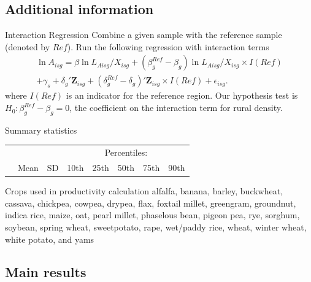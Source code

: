 \documentclass[10pt, xcolor=dvipsnames]{beamer}
\begin{document}
\subsection{Additional information}
\begin{frame}{Interaction Regression}\label{interaction}
Combine a given sample with the reference sample (denoted by $Ref$). Run the following regression with interaction terms
\begin{eqnarray}
    \ln A_{isg} = \beta \ln L_{Aisg}/X_{isg} + (\beta^{Ref}_g - \beta_g) \ln L_{Aisg}/X_{isg} \times I(Ref) \\ \nonumber
    + \gamma_{s} + \delta_g' \mathbf{Z}_{isg} + (\delta^{Ref}_g - \delta_g)'\mathbf{Z}_{isg} \times I(Ref) + \epsilon_{isg}. \label{EQ_interaction}
\end{eqnarray}
where $I(Ref)$ is an indicator for the reference region. Our hypothesis test is $H_0: \beta^{Ref}_g - \beta_g = 0$, the coefficient on the interaction term for rural density. 

\hfill \hyperlink{testing}{}
\end{frame}

\begin{frame}{Summary statistics}\label{stats}
{\scriptsize
\begin{tabularx}{\textwidth}{lXXXXXXX}
\midrule
 &      &            & \multicolumn{5}{c}{Percentiles:} \\ \cmidrule{4-8}
 & Mean & SD  & 10th    & 25th    & 50th & 75th & 90th \\
\midrule

\midrule
\end{tabularx}
}

\hfill \hyperlink{data}{}
\end{frame}

\begin{frame}{Crops used in productivity calculation}\label{crops}
alfalfa, banana, barley, buckwheat, cassava, chickpea, cowpea, drypea, flax, foxtail millet, greengram, groundnut, indica rice, maize, oat, pearl millet, phaselous bean, pigeon pea, rye, sorghum, soybean, spring wheat, sweetpotato, rape, wet/paddy rice, wheat, winter wheat, white potato, and yams

\hfill \hyperlink{data}{}
\end{frame}

\subsection{Main results}
\end{document}
